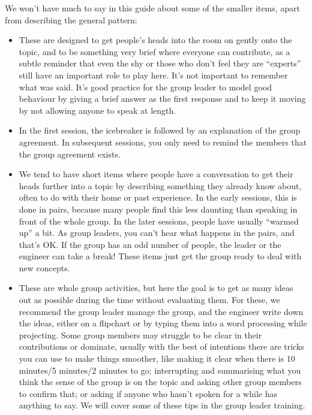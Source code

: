 \documentclass[letterpaper,10pt,english]{jupyterBook}
\begin{document}
\sphinxAtStartPar
We won’t have much to say in this guide about some of the smaller items, apart from describing the general pattern:
\begin{itemize}
\item {} 
\sphinxAtStartPar
{}  These are designed to get people’s heads into the room on gently onto the topic, and to be something very brief where everyone can contribute, as a subtle reminder that even the shy or those who don’t feel they are “experts” still have an important role to play here.  It’s not important to remember what was said. It’s good practice for the group leader to model good behaviour by giving a brief answer as the first response and to keep it moving by not allowing anyone to speak at length.

\item {} 
\sphinxAtStartPar
{} In the first session, the icebreaker is followed by an explanation of the group agreement. In subsequent sessions, you only need to remind the members that the group agreement exists.

\item {} 
\sphinxAtStartPar
{}  We tend to have short items where people have a conversation to get their heads further into a topic by describing something they already know about, often to do with their home or past experience.  In the early sessions, this is done in pairs, because many people find this less daunting than speaking in front of the whole group.  In the later sessions, people have usually “warmed up” a bit.  As group leaders, you can’t hear what happens in the pairs, and that’s OK.  If the group has an odd number of people, the leader or the engineer can take a break! These items just get the group ready to deal with new concepts.

\item {} 
\sphinxAtStartPar
{}  These are whole group activities, but here the goal is to get as many ideas out as possible during the time without evaluating them.  For these, we recommend the group leader manage the group, and the engineer write down the ideas, either on a flipchart or by typing them into a word processing while projecting.   Some group members may struggle to be clear in their contributions or dominate, usually with the best of intentions \sphinxhyphen{} there are tricks you can use to make things smoother, like making it clear when there is 10 minutes/5 minutes/2 minutes to go; interrupting and summarising what you think the sense of the group is on the topic and asking other group members to confirm that; or asking if anyone who hasn’t spoken for a while has anything to say. We will cover some of these tips in the group leader training.


\end{itemize}
\end{document}
